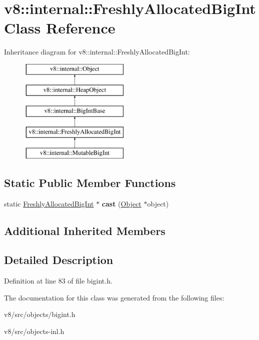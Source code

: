 \hypertarget{classv8_1_1internal_1_1FreshlyAllocatedBigInt}{}\section{v8\+:\+:internal\+:\+:Freshly\+Allocated\+Big\+Int Class Reference}
\label{classv8_1_1internal_1_1FreshlyAllocatedBigInt}
Inheritance diagram for v8\+:\+:internal\+:\+:Freshly\+Allocated\+Big\+Int\+:\begin{figure}[H]
\begin{center}
\leavevmode
\includegraphics[height=5.000000cm]{classv8_1_1internal_1_1FreshlyAllocatedBigInt}
\end{center}
\end{figure}
\subsection*{Static Public Member Functions}
\begin{DoxyCompactItemize}
\item 
\mbox{\label{classv8_1_1internal_1_1FreshlyAllocatedBigInt_a41c3a7d30f6fa0c4b6b4b4f3e02c28e8}} 
static \mbox{\hyperlink{classv8_1_1internal_1_1FreshlyAllocatedBigInt}{Freshly\+Allocated\+Big\+Int}} $\ast$ {\bfseries cast} (\mbox{\hyperlink{classv8_1_1internal_1_1Object}{Object}} $\ast$object)
\end{DoxyCompactItemize}
\subsection*{Additional Inherited Members}


\subsection{Detailed Description}


Definition at line 83 of file bigint.\+h.



The documentation for this class was generated from the following files\+:\begin{DoxyCompactItemize}
\item 
v8/src/objects/bigint.\+h\item 
v8/src/objects-\/inl.\+h\end{DoxyCompactItemize}
